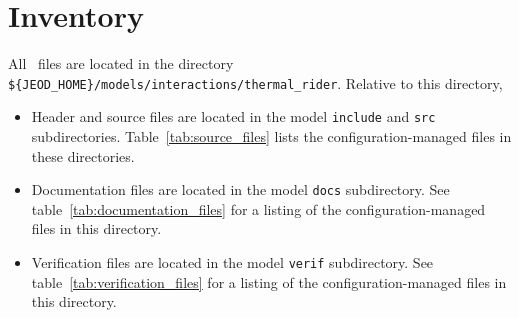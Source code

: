 %
%
% 
%


\section{Inventory}
All \ThermalRiderDesc\ files are located in the directory \newline
{\tt \$\{JEOD\_HOME\}/models/interactions/thermal\_rider}.
Relative to this directory,
\begin{itemize}
\vspace{-0.2\baselineskip}
\item Header and source files are located
in the model {\tt include} and {\tt src} subdirectories.
Table~\ref{tab:source_files} lists the
configuration-managed files in these directories.
\vspace{-0.1\baselineskip}
\item Documentation files are located in the model {\tt docs} subdirectory.
See table~\ref{tab:documentation_files}
for a listing of the
configuration-managed files in this directory.
\vspace{-0.1\baselineskip}
\item Verification files are located in the model {\tt verif} subdirectory.
See table~\ref{tab:verification_files}
for a listing of the
configuration-managed files in this directory.
\end{itemize}


